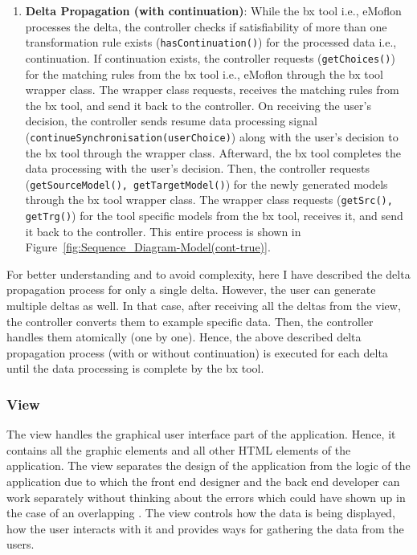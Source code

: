 \begin{enumerate}
	\item {\textbf{Delta Propagation (with continuation)}: While the bx tool i.e., eMoflon processes the delta, the controller checks if satisfiability of more than one transformation rule exists (\texttt{hasContinuation()}) for the processed data i.e., continuation. If continuation exists, the controller requests (\texttt{getChoices()}) for the matching rules from the bx tool i.e., eMoflon through the bx tool wrapper class. The wrapper class requests, receives the matching rules from the bx tool, and send it back to the controller. On receiving the user's decision, the controller sends resume data processing signal (\texttt{continueSynchronisation(userChoice)}) along with the user's decision to the bx tool through the wrapper class. Afterward, the bx tool completes the data processing with the user's decision. Then, the controller requests (\texttt{getSourceModel(), getTargetModel()}) for the newly generated models through the bx tool wrapper class. The wrapper class requests (\texttt{getSrc(), getTrg()}) for the tool specific models from the bx tool, receives it, and send it back to the controller. This entire process is shown in Figure~\ref{fig:Sequence_Diagram-Model(cont-true)}.}
\end{enumerate}

For better understanding and to avoid complexity, here I have described the delta propagation process for only a single delta. However, the user can generate multiple deltas as well. In that case, after receiving all the deltas from the view, the controller converts them to example specific data. Then, the controller handles them atomically (one by one). Hence, the above described delta propagation process (with or without continuation) is executed for each delta until the data processing is complete by the bx tool. 

\subsubsection{View}\label{subsubsec:design_view}
The view handles the graphical user interface part of the application. Hence, it contains all the graphic elements and all other HTML elements of the application. The view separates the design of the application from the logic of the application due to which the front end designer and the back end developer can work separately without thinking about the errors which could have shown up in the case of an overlapping \cite{designpattern-headfirst} \cite{mvc-arch}. The view controls how the data is being displayed, how the user interacts with it and provides ways for gathering the data from the users.

